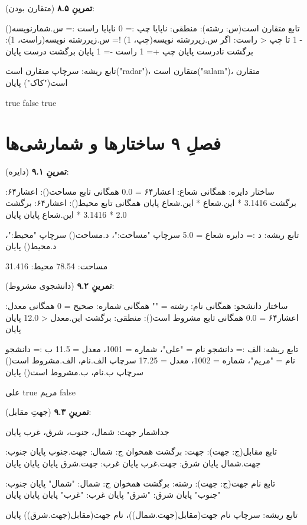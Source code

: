 \textbf{تمرینِ ۸.۵} (متقارن بودن):
\begin{salamfa}
تابع متقارن است(س: رشته): منطقی:
    ناپایا چپ := 0
    ناپایا راست := س.شمارنویسه() - 1
    تا چپ < راست:
        اگر س.زیررشته نویسه(چپ، 1) != س.زیررشته نویسه(راست، 1):
            برگشت نادرست
        پایان
        چپ += 1
        راست -= 1
    پایان
    برگشت درست
پایان

تابع ریشه:
    سرچاپ متقارن است("radar")، متقارن است("salam")، متقارن است("کاک")
پایان
\end{salamfa}

\begin{progoutfa}
true false true
\end{progoutfa}

\section*{فصلِ ۹ ساختارها و شمارشی‌ها}
{}

\textbf{تمرینِ ۹.۱} (دایره):
\begin{salamfa}
ساختار دایره:
    همگانی شعاع: اعشار۶۴ = 0.0
    همگانی تابع مساحت(): اعشار۶۴: برگشت 3.1416 * این.شعاع * این.شعاع پایان
    همگانی تابع محیط(): اعشار۶۴: برگشت 2.0 * 3.1416 * این.شعاع پایان
پایان

تابع ریشه:
    د := دایره { شعاع = 5.0 }
    سرچاپ "مساحت:"، د.مساحت()
    سرچاپ "محیط:"، د.محیط()
پایان
\end{salamfa}

\begin{progoutfa}
مساحت: 78.54
محیط: 31.416
\end{progoutfa}

\textbf{تمرینِ ۹.۲} (دانشجوی مشروط):
\begin{salamfa}
ساختار دانشجو:
    همگانی نام: رشته = ""
    همگانی شماره: صحیح = 0
    همگانی معدل: اعشار۶۴ = 0.0
    همگانی تابع مشروط است(): منطقی: برگشت این.معدل < 12.0 پایان
پایان

تابع ریشه:
    الف := دانشجو { نام = "علی"، شماره = 1001، معدل = 11.5 }
    ب := دانشجو { نام = "مریم"، شماره = 1002، معدل = 17.25 }
    سرچاپ الف.نام، الف.مشروط است()
    سرچاپ ب.نام، ب.مشروط است()
پایان
\end{salamfa}

\begin{progoutfa}
علی true
مریم false
\end{progoutfa}

\textbf{تمرینِ ۹.۳} (جهتِ مقابل):
\begin{salamfa}
جداشمار جهت: شمال، جنوب، شرق، غرب پایان

تابع مقابل(ج: جهت): جهت:
    برگشت همخوان ج:
        شمال: جهت.جنوب پایان
        جنوب: جهت.شمال پایان
        شرق: جهت.غرب پایان
        غرب: جهت.شرق پایان
    پایان
پایان

تابع نام جهت(ج: جهت): رشته:
    برگشت همخوان ج:
        شمال: "شمال" پایان
        جنوب: "جنوب" پایان
        شرق: "شرق" پایان
        غرب: "غرب" پایان
    پایان
پایان

تابع ریشه:
    سرچاپ نام جهت(مقابل(جهت.شمال))، نام جهت(مقابل(جهت.شرق))
پایان
\end{salamfa}

